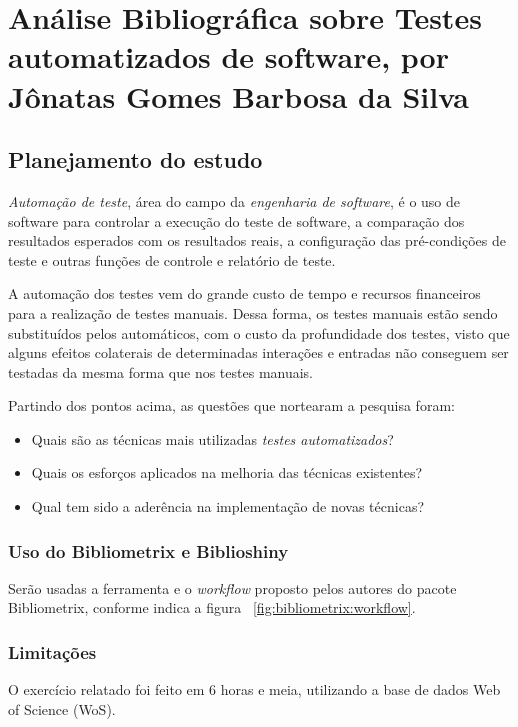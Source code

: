 \chapter{Análise Bibliográfica sobre Testes automatizados de software, por Jônatas Gomes Barbosa da Silva\label{chap:bibliometria:titofrota}}

\section{Planejamento do estudo}

\textit{Automação de teste}, área do campo da \textit{engenharia de software}, é o uso de software para controlar a execução do teste de software, a comparação dos resultados esperados com os resultados reais, a configuração das pré-condições de teste e outras funções de controle e relatório de teste. 

A automação dos testes vem do grande custo de tempo e recursos financeiros para a realização de testes manuais. Dessa forma, os testes manuais estão sendo substituídos pelos automáticos, com o custo da profundidade dos testes, visto que alguns efeitos colaterais de determinadas interações e entradas não conseguem ser testadas da mesma forma que nos testes manuais.

Partindo dos pontos acima, as questões que nortearam a pesquisa foram:
\begin{itemize}
    \item Quais são as técnicas mais utilizadas \textit{testes automatizados}?
    \item Quais os esforços aplicados na melhoria das técnicas existentes?
    \item Qual tem sido a aderência na implementação de novas técnicas?
\end{itemize}

\subsection{Uso do Bibliometrix e Biblioshiny}
Serão usadas a ferramenta e o \textit{workflow} proposto pelos autores do pacote Bibliometrix, conforme indica a figura ~\ref{fig:bibliometrix:workflow}.

\subsection{Limitações} O exercício relatado foi feito em 6 horas e meia, utilizando a base de dados Web of Science (WoS).


